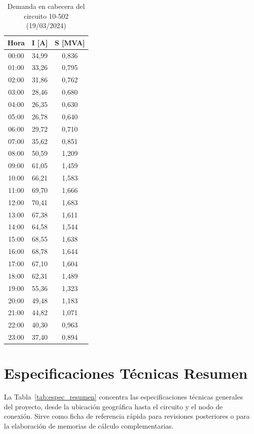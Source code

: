 \begin{table}[H]
    \centering
    \small
    \caption{Demanda en cabecera del circuito 10-502 (19/03/2024)}
    \label{tab:demanda_24h}
    \begin{tabular}{ccc}
    \toprule
    \textbf{Hora} & \textbf{I [A]} & \textbf{S [MVA]} \\
    \midrule
    00:00 & 34,99 & 0,836 \\
    01:00 & 33,26 & 0,795 \\
    02:00 & 31,86 & 0,762 \\
    03:00 & 28,46 & 0,680 \\
    04:00 & 26,35 & 0,630 \\
    05:00 & 26,78 & 0,640 \\
    06:00 & 29,72 & 0,710 \\
    07:00 & 35,62 & 0,851 \\
    08:00 & 50,59 & 1,209 \\
    09:00 & 61,05 & 1,459 \\
    10:00 & 66,21 & 1,583 \\
    11:00 & 69,70 & 1,666 \\
    12:00 & 70,41 & 1,683 \\
    13:00 & 67,38 & 1,611 \\
    14:00 & 64,58 & 1,544 \\
    15:00 & 68,55 & 1,638 \\
    16:00 & 68,78 & 1,644 \\
    17:00 & 67,10 & 1,604 \\
    18:00 & 62,31 & 1,489 \\
    19:00 & 55,36 & 1,323 \\
    20:00 & 49,48 & 1,183 \\
    21:00 & 44,82 & 1,071 \\
    22:00 & 40,30 & 0,963 \\
    23:00 & 37,40 & 0,894 \\
    \bottomrule
    \end{tabular}
\end{table}

\section{Especificaciones Técnicas Resumen}

La Tabla~\ref{tab:espec_resumen} concentra las especificaciones técnicas generales del proyecto, desde la ubicación geográfica hasta el circuito y el nodo de conexión. Sirve como ficha de referencia rápida para revisiones posteriores o para la elaboración de memorias de cálculo complementarias.

